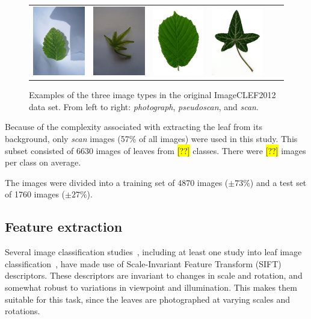 \begin{figure}[htb]
{\begin{tabular}{c@{\hskip 0.1in}c|c@{\hskip 0.1in}c|c@{\hskip 0.1in}c}
\includegraphics[width = .12\textwidth]{image/5093pseudoscan.jpg} &
\includegraphics[width = .12\textwidth]{image/2655pseudoscan.jpg} &
\includegraphics[width = .12\textwidth]{image/8736scan.jpg} &
\includegraphics[width = .12\textwidth]{image/5292scan.jpg}
\end{tabular}
}
\caption{Examples of the three image types in the original ImageCLEF2012 data set. From left to right: \emph{photograph}, \emph{pseudoscan}, and \emph{scan}.}
\label{fig:imagetypes}
\end{figure}

Because of the complexity associated with extracting the leaf from its background, only \emph{scan} images (57\% of all images) were used in this study.
This subset consisted of 6630 images of leaves from \hl{[??]} classes.		%
There were \hl{[??]} images per class on average.	%

The images were divided into a training set of 4870 images ($\pm 73\%$) and a test set of 1760 images ($\pm 27\%$).


\subsection{Feature extraction}
Several image classification studies~\cite{Wang2015, Lowe1999}, including at least one study into leaf image classification~\cite{Wang2011}, have made use of Scale-Invariant Feature Transform (SIFT) descriptors.
These descriptors are invariant to changes in scale and rotation, and somewhat robust to variations in viewpoint and illumination.
This makes them suitable for this task, since the leaves are photographed at varying scales and rotations.

